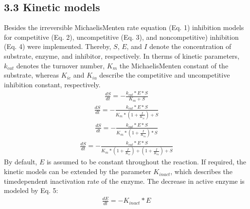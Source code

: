 \documentclass[letterpaper,10pt,english]{jupyterBook}
\begin{document}
\subsection{3.3 Kinetic models}
\label{\detokenize{methods:kinetic-models}}
\sphinxAtStartPar
Besides the irreversible Michaelis\sphinxhyphen{}Menten rate equation (Eq. 1) inhibition models for competitive (Eq. 2), uncompetitive (Eq. 3), and non\sphinxhyphen{}competitive) inhibition (Eq. 4) were implemented. Thereby, \(S\), \(E\), and \(I\) denote the concentration of substrate, enzyme, and inhibitor, respectively. In therms of kinetic parameters, \(k_{cat}\) denotes the turnover number, \(K_{m}\) the Michaelis\sphinxhyphen{}Menten constant of the substrate, whereas \(K_{ic}\) and \(K_{iu}\) describe the competitive and uncompetitive inhibition constant, respectively.
\begin{equation}\label{equation:methods:irreversible_mm}
\begin{split}\frac{dS}{dt} = -\frac{k_{cat} * E * S}{K_{m} + S}\end{split}
\end{equation}\begin{equation}\label{equation:methods:competitive_inhibition}
\begin{split}\frac{dS}{dt} = -\frac{k_{cat} * E * S}{K_{m} * (1+\frac{I}{K_{ic}}) + S}\end{split}
\end{equation}\begin{equation}\label{equation:methods:uncompetitive_inhibition}
\begin{split}\frac{dS}{dt} = -\frac{k_{cat} * E * S}{K_{m} * (1+\frac{I}{K_{iu}}) * S}\end{split}
\end{equation}\begin{equation}\label{equation:methods:noncompetitive_inhibition}
\begin{split}\frac{dS}{dt} = -\frac{k_{cat} * E * S}{K_{m} * (1+\frac{I}{K_{ic}}) + (1+\frac{I}{K_{iu}}) + S}\end{split}
\end{equation}
\sphinxAtStartPar
By default, \(E\) is assumed to be constant throughout the reaction. If required, the kinetic models can be extended by the parameter \(K_{inact}\), which describes the time\sphinxhyphen{}dependent inactivation rate of the enzyme. The decrease in active enzyme is modeled by Eq. 5:
\begin{equation}\label{equation:methods:enzyme_inactivation}
\begin{split}\frac{dE}{dt} = -K_{inact} * E\end{split}
\end{equation}
\end{document}

